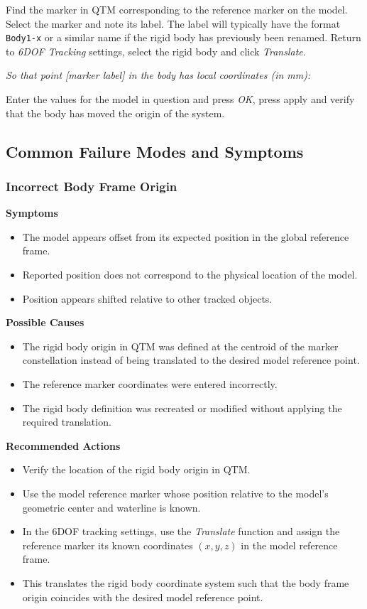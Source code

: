 \documentclass[12pt,a4paper]{article}
\begin{document}
Find the marker in QTM corresponding to the reference marker on the model. Select the marker and note its label. The label will typically have the format \texttt{Body1-x} or a similar name if the rigid body has previously been renamed. Return to \emph{6DOF Tracking} settings, select the rigid body and click \emph{Translate}. 

\begin{center}
	\emph{So that point [marker label] in the body has local coordinates (in mm):}
\end{center}
Enter the values for the model in question and press \emph{OK}, press apply and verify that the body has moved the origin of the system. 



\subsection{Common Failure Modes and Symptoms}
\subsubsection{Incorrect Body Frame Origin}
\textbf{Symptoms}
\begin{itemize}
	\item The model appears offset from its expected position in the global reference frame.
	\item Reported position does not correspond to the physical location of the model.
	\item Position appears shifted relative to other tracked objects.
\end{itemize}

\textbf{Possible Causes}
\begin{itemize}
	\item The rigid body origin in QTM was defined at the centroid of the marker constellation instead of being translated to the desired model reference point.
	\item The reference marker coordinates were entered incorrectly.
	\item The rigid body definition was recreated or modified without applying the required translation.
\end{itemize}

\textbf{Recommended Actions}
\begin{itemize}
	\item Verify the location of the rigid body origin in QTM.
	\item Use the model reference marker whose position relative to the model's geometric center and waterline is known.
	\item In the 6DOF tracking settings, use the \emph{Translate} function and assign the reference marker its known coordinates $(x,y,z)$ in the model reference frame.
	\item This translates the rigid body coordinate system such that the body frame origin coincides with the desired model reference point.
\end{itemize}
\end{document}
